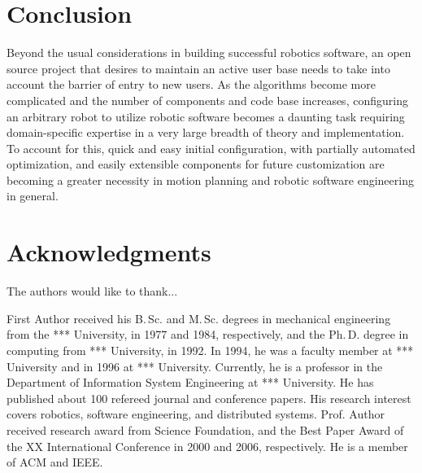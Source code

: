 \documentclass[10pt,journal,compsoc]{joser1}
\begin{document}
{%
\section{Conclusion}

Beyond the usual considerations in building successful robotics software, an open source project that desires to maintain an active user base needs to take into account the barrier of entry to new users. As the algorithms become more complicated and the number of components and code base increases, configuring an arbitrary robot to utilize robotic software becomes a daunting task requiring domain-specific expertise in a very large breadth of theory and implementation. To account for this, quick and easy initial configuration, with partially automated optimization, and easily extensible components for future customization are becoming a greater necessity in motion planning and robotic software engineering in general. 

\section*{Acknowledgments}
The authors would like to thank...





\begin{IEEEbiography}[{coleman}]{First Author}
received his B.\,Sc. and
M.\,Sc. degrees in mechanical engineering from the *** University,
in 1977 and 1984, respectively, and the Ph.\,D. degree in
computing from *** University, in 1992. In 1994, he was a
faculty member at *** University and in 1996 at ***
University. Currently, he is a professor in the Department of
Information System Engineering at *** University.
He has published about 100 refereed journal and conference papers.
His research interest covers robotics, software engineering, and distributed systems.
Prof. Author received research award from Science Foundation, and
the Best Paper Award of the XX International Conference in 2000 and
2006, respectively. He is a member of ACM and IEEE.
\end{IEEEbiography}

}
\end{document}
